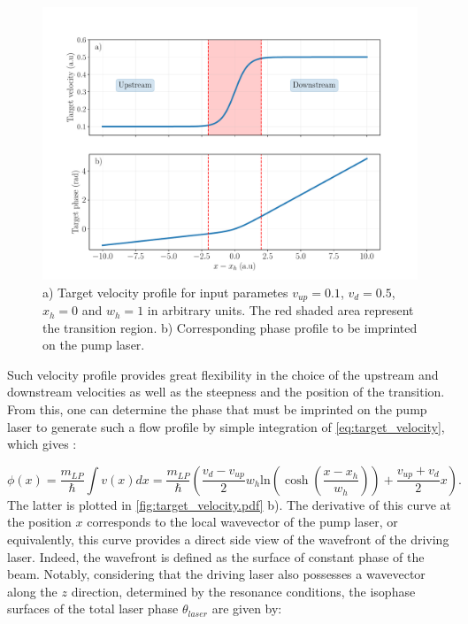 \begin{figure}[h]
    \centering
    \includegraphics[width=1\textwidth]{chap_custom_st/fig/target_velocity.pdf}
    \caption{ a) Target velocity profile for input parametes $v_{up}=0.1$, $v_{d}=0.5$, $x_h=0$ and $w_h=1$ in arbitrary units. The red shaded area represent the 
    transition region. b) Corresponding phase profile to be imprinted on the pump laser.}
    \label{fig:target_velocity.pdf}
\end{figure}

Such velocity profile provides great flexibility in the choice of the upstream and downstream velocities as well as the steepness and the position of the transition. From this, one can determine the phase that must be imprinted on the pump laser to generate such a flow profile by simple integration of \autoref{eq:target_velocity}, which gives :

\begin{equation}
    \phi(x) = \dfrac{m_{LP}}{\hbar} \int v(x) dx = \dfrac{m_{LP}}{\hbar} \left( \dfrac{v_{d}-v_{up}}{2} w_h \mathrm{ln}(\cosh(\dfrac{x-x_h}{w_h}))+\dfrac{v_{up}+v_{d}}{2}x \right).
    \label{eq:target_phase_profile}
\end{equation}
The latter is plotted in \autoref{fig:target_velocity.pdf} b). The derivative of this curve at the position $x$ corresponds to the local wavevector of the pump laser, or equivalently, this curve provides a direct side view of the wavefront of the driving laser.
 Indeed, the wavefront is defined as the surface of constant phase of the beam. Notably, considering that the driving laser also possesses a wavevector along the $z$ direction, determined by the resonance conditions, the isophase surfaces of the total laser phase $\theta_{laser}$ are given by:  


